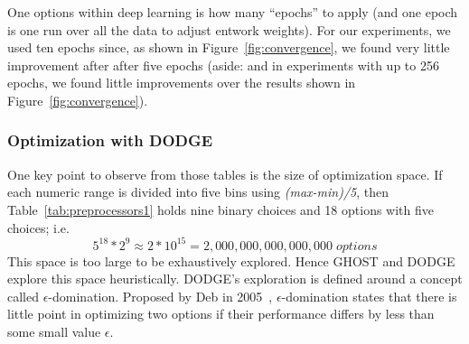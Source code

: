 \documentclass[10pt,compsoc,twocolumn]{IEEEtran}
\begin{document}
 One options within deep learning is how many ``epochs'' to apply (and one epoch is one run over all the data to adjust entwork weights). 
For our experiments, we used  ten epochs since,   as shown in Figure~\ref{fig:convergence}, we found very little improvement after  after five epochs
 (aside:   and in experiments with up to 256 epochs, we found little improvements over the results shown in Figure~\ref{fig:convergence}).
 



  
 
 



\subsubsection{Optimization with DODGE}
\label{sec:dodge}

One key point to observe from those tables is the size of optimization space. If each numeric range is divided into five bins using {\em (max-min)/5}, then Table~\ref{tab:preprocessors1} holds nine binary choices and 18 options with five choices; i.e. \[5^{18}*2^9 \approx 2*10^{15} = 2,000,000,000,000,000\;\mathit{options}\]
This space is too large to be exhaustively explored. Hence
GHOST   and 
DODGE \cite{agrawal2019dodge} explore this space heuristically.
DODGE's exploration is defined around
 a concept called $\epsilon$-domination.  Proposed by Deb in 2005~\cite{deb2005evaluating}, $\epsilon$-domination states that there is little point in optimizing two options if their performance differs by less than some small value $\epsilon$.
 
\end{document}
